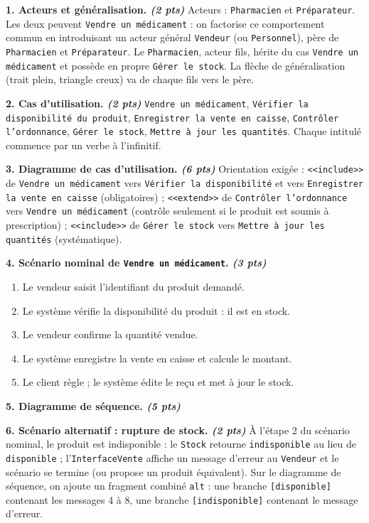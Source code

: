 \documentclass[11pt]{article}
\begin{document}
\begin{corrige}
\textbf{1. Acteurs et généralisation. \emph{(2 pts)}} Acteurs : \texttt{Pharmacien} et \texttt{Préparateur}. Les deux peuvent \texttt{Vendre un médicament} : on factorise ce comportement commun en introduisant un acteur général \texttt{Vendeur} (ou \texttt{Personnel}), père de \texttt{Pharmacien} et \texttt{Préparateur}. Le \texttt{Pharmacien}, acteur fils, hérite du cas \texttt{Vendre un médicament} et possède en propre \texttt{Gérer le stock}. La flèche de généralisation (trait plein, triangle creux) va de chaque fils vers le père.

\textbf{2. Cas d'utilisation. \emph{(2 pts)}} \texttt{Vendre un médicament}, \texttt{Vérifier la disponibilité du produit}, \texttt{Enregistrer la vente en caisse}, \texttt{Contrôler l'ordonnance}, \texttt{Gérer le stock}, \texttt{Mettre à jour les quantités}. Chaque intitulé commence par un verbe à l'infinitif.

\textbf{3. Diagramme de cas d'utilisation. \emph{(6 pts)}}
Orientation exigée : \texttt{<<include>>} de \texttt{Vendre un médicament} vers \texttt{Vérifier la disponibilité} et vers \texttt{Enregistrer la vente en caisse} (obligatoires) ; \texttt{<<extend>>} de \texttt{Contrôler l'ordonnance} vers \texttt{Vendre un médicament} (contrôle seulement si le produit est soumis à prescription) ; \texttt{<<include>>} de \texttt{Gérer le stock} vers \texttt{Mettre à jour les quantités} (systématique).

\textbf{4. Scénario nominal de \texttt{Vendre un médicament}. \emph{(3 pts)}}
\begin{enumerate}
\item Le vendeur saisit l'identifiant du produit demandé.
\item Le système vérifie la disponibilité du produit : il est en stock.
\item Le vendeur confirme la quantité vendue.
\item Le système enregistre la vente en caisse et calcule le montant.
\item Le client règle ; le système édite le reçu et met à jour le stock.
\end{enumerate}

\textbf{5. Diagramme de séquence. \emph{(5 pts)}}

\textbf{6. Scénario alternatif : rupture de stock. \emph{(2 pts)}} À l'étape 2 du scénario nominal, le produit est indisponible : le \texttt{Stock} retourne \texttt{indisponible} au lieu de \texttt{disponible} ; l'\texttt{InterfaceVente} affiche un message d'erreur au \texttt{Vendeur} et le scénario se termine (ou propose un produit équivalent). Sur le diagramme de séquence, on ajoute un fragment combiné \texttt{alt} : une branche \texttt{[disponible]} contenant les messages 4 à 8, une branche \texttt{[indisponible]} contenant le message d'erreur.


\end{corrige}
\end{document}
